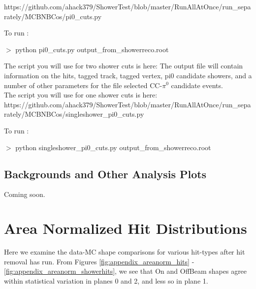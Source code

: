 \documentclass{article}
\begin{document}
\noindent https://github.com/ahack379/ShowerTest/blob/master/RunAllAtOnce/run\_separately/MCBNBCos/pi0\_cuts.py

\noindent To run :
\par $>$ python pi0\_cuts.py output\_from\_showerreco.root

The script you will use for two shower cuts is here:
\noindent The output file will contain information on the hits, tagged track, tagged vertex, pi0 candidate showers, and a number of other parameters for the file selected CC-$\pi^0$ candidate events. \\

\noindent The script you will use for one shower cuts is here:
https://github.com/ahack379/ShowerTest/blob/master/RunAllAtOnce/run\_separately/MCBNBCos/singleshower\_pi0\_cuts.py

\noindent To run :
\par $>$ python singleshower\_pi0\_cuts.py output\_from\_showerreco.root

\subsection{Backgrounds and Other Analysis Plots}
Coming soon.






\clearpage
\section{Area Normalized Hit Distributions}
\label{sec:AppB}
Here we examine the data-MC shape comparisons for various hit-types after hit removal has run.  From Figures \ref{fig:appendix_areanorm_hits} - \ref{fig:appendix_areanorm_showerhits}, we see that On and OffBeam shapes agree within statistical variation in planes 0 and 2, and less so in plane 1. 
\end{document}
